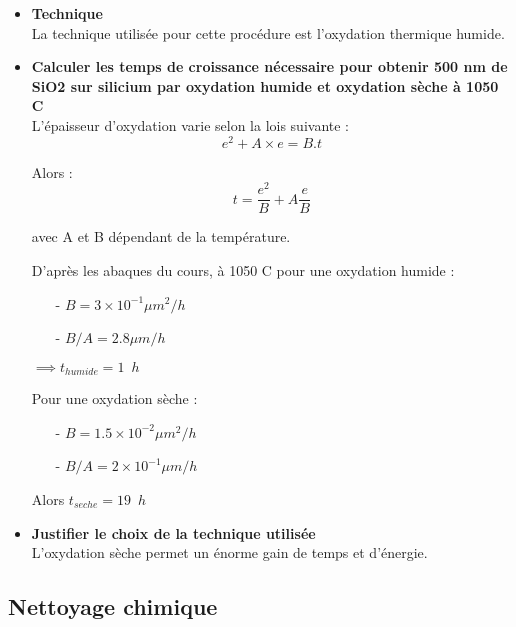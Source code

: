 \documentclass[11pt]{article}
\begin{document}
\begin{itemize}
\item \textbf{Technique}\\
La technique utilis\'ee pour cette proc\'edure est l'oxydation thermique humide.

\item \textbf{Calculer les temps de croissance n\'ecessaire pour obtenir 500 nm de SiO2 sur silicium par oxydation humide et oxydation s\`eche \`a 1050 C}\\

L'\'epaisseur d'oxydation varie selon la lois suivante :
\[
    e^{2} + A \times e = B.t
\]

Alors :
\[
t = \frac{e^{2}}{B} + A\frac{e}{B}
\]

avec A et B d\'ependant de la temp\'erature.

D'apr\`es les abaques du cours, \`a 1050 C pour une oxydation humide : 
\begin{itemize} \itemsep -2pt
\item[-] $B = 3 \times 10^{-1} \mu m^{2}/h$
\item[-] $B/A = 2.8 \mu m/h$
\end{itemize}

$\implies t_{humide} = 1 \phantom{2} h$

Pour une oxydation s\`eche :

\begin{itemize} \itemsep -2pt
\item[-] $B = 1.5 \times 10^{-2} \mu m^{2}/h$
\item[-] $B/A = 2 \times 10^{-1} \mu m/h$
\end{itemize}


Alors $t_{seche} = 19 \phantom{2} h$


\item \textbf{Justifier le choix de la technique utilis\'ee}\\
L'oxydation s\`eche permet un \'enorme gain de temps et d'\'energie.
\end{itemize}

\subsection{Nettoyage chimique}
\end{document}
